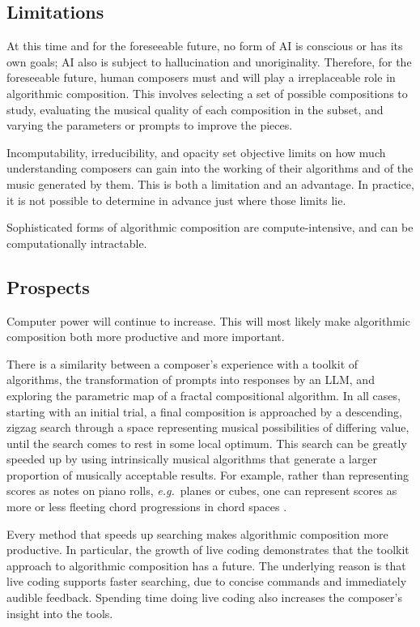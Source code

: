 \documentclass[11pt,papersize=a4]{scrartcl}
\begin{document}
\subsection*{Limitations}

At this time and for the foreseeable future, no form of AI is conscious or has its own goals; AI also is subject to hallucination and unoriginality. Therefore, for the foreseeable future, human composers must and will play a irreplaceable role in algorithmic composition. This involves selecting a set of possible compositions to study, evaluating the musical quality of each composition in the subset, and varying the parameters or prompts to improve  the pieces.

Incomputability, irreducibility, and opacity set objective limits on how much understanding composers can gain into the working of their algorithms and of the music generated by them. This is both a limitation and an advantage. In practice, it is not possible to determine in advance just where those limits lie.

Sophisticated forms of algorithmic composition are compute-intensive, and can be computationally intractable.

\subsection*{Prospects}

Computer power will continue to increase. This will most likely make algorithmic composition both more productive and more important.

There is a similarity between a composer's experience with a toolkit of algorithms, the transformation of prompts into responses by an LLM, and exploring the parametric map of a fractal compositional algorithm. In all cases, starting with an initial trial, a final composition is approached by a descending, zigzag search through a space representing musical possibilities of differing value, until the search comes to rest in some local optimum. This search can be greatly speeded up by using intrinsically musical algorithms that generate a larger proportion of musically acceptable results. For example, rather than representing scores as notes on piano rolls, \emph{e.g.}\ planes or cubes, one can represent scores as more or less fleeting chord progressions in chord spaces \parencite{gogins2006score, gogins2023scoregraphs}.

Every method that speeds up searching makes algorithmic composition more productive. In particular, the growth of live coding demonstrates that the toolkit approach to algorithmic composition has a future. The underlying reason is that live coding supports faster searching, due to concise commands and immediately audible feedback. Spending time doing live coding also increases the composer's insight into the tools.
\end{document}
